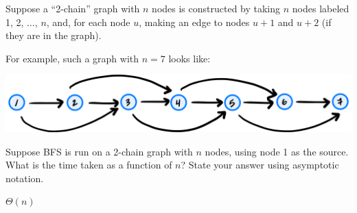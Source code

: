 \begin{prob}
    Suppose a ``2-chain'' graph with $n$ nodes is constructed by taking $n$
    nodes labeled 1, 2, $\ldots$, $n$, and, for each node $u$, making an edge to
    nodes $u + 1$ and $u + 2$ (if they are in the graph).

    For example, such a graph with $n = 7$ looks like:

    \includegraphics[width=.8\textwidth]{./g3.png}

    Suppose BFS is run on a 2-chain graph with $n$ nodes, using node 1 as the
    source. What is the time taken as a function of $n$? State your answer
    using asymptotic notation.

    \begin{soln}
        $\Theta(n)$
    \end{soln}

\end{prob}
